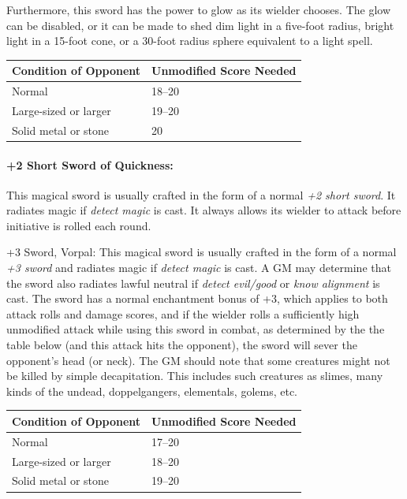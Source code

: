 \begin{multicols}{2}
Furthermore, this sword has the power to glow as its wielder chooses.  The glow can be disabled, or it can be made to shed dim light in a five-foot radius, bright light in a 15-foot cone, or a 30-foot radius sphere equivalent to a light spell.

\noindent \begin{tabular}{|p{}|p{}|}
\hline
Condition of Opponent	& Unmodified Score Needed \\
\hline\hline
\rowcolor[gray]{0.9}Normal	& 18--20 \\
Large-sized or larger	& 19--20 \\
\rowcolor[gray]{0.9}Solid metal or stone	& 20 \\
\hline
\end{tabular}

\paragraph{+2 Short Sword of Quickness:} This magical sword is usually crafted in the form of a normal \textit{+2 short sword}. It radiates magic if \textit{detect magic} is cast.  It always allows its wielder to attack before initiative is rolled each round.

+3 Sword, Vorpal: This magical sword is usually crafted in the form of a normal \textit{+3 sword} and radiates magic if \textit{detect magic} is cast.  A GM may determine that the sword also radiates lawful neutral if \textit{detect evil/good} or \textit{know alignment} is cast.  The sword has a normal enchantment bonus of +3, which applies to both attack rolls and damage scores, and if the wielder rolls a sufficiently high unmodified attack while using this sword in combat, as determined by the the table below (and this attack hits the opponent), the sword will sever the opponent's head (or neck).  The GM should note that some creatures might not be killed by simple decapitation.  This includes such creatures as slimes, many kinds of the undead, doppelgangers, elementals, golems, etc.

\noindent \begin{tabular}{|p{}|p{}|}
\hline
Condition of Opponent	& Unmodified Score Needed \\
\hline\hline
\rowcolor[gray]{0.9}Normal	& 17--20 \\
Large-sized or larger	& 18--20 \\
\rowcolor[gray]{0.9}Solid metal or stone	& 19--20 \\
\hline
\end{tabular}


\end{multicols}
